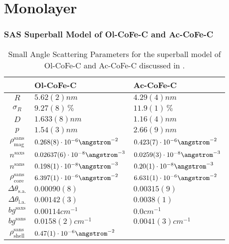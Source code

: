 \documentclass[\main/dresen_thesis.tex]{subfiles}
\begin{document}
\section{Monolayer}
\subsubsection{SAS Superball Model of Ol-CoFe-C and Ac-CoFe-C}\label{ch:appendix:modelparameters:monolayers:sas_olac_cofe_c}
\begin{table}[h]
  \centering
  \caption{\label{tab:appendix:modelparamters:monolayers:nanoparticle:sas}Small Angle Scattering Parameters for the superball model of Ol-CoFe-C and Ac-CoFe-C discussed in .}
  \begin{tabular}{ c | l | l }
      & Ol-CoFe-C & Ac-CoFe-C \\
    \hline
    $R$
      & $5.62(2) \unit{nm}$
      & $4.29(4) \unit{nm}$\\
    $\sigma_R$
      & $9.27(8) \,\%$
      & $11.9(1) \,\%$\\
    $D$
      & $1.633(8) \unit{nm}$
      & $1.16(4) \unit{nm}$\\
    $p$
      & $1.54(3) \unit{nm}$
      & $2.66(9) \unit{nm}$\\
    $\rho_\mathrm{mag}^\mathrm{sans}$
      & $0.268(8) \cdot 10^{-6} \angstrom^{-2}$
      & $0.423(7) \cdot 10^{-6} \angstrom^{-2}$\\
    \hline
    $n^\mathrm{saxs}$
      & $0.02637(6) \cdot 10^{-8} \angstrom^{-3}$
      & $0.0259(3) \cdot 10^{-8} \angstrom^{-3}$\\
    $n^\mathrm{sans}$
      & $0.198(1) \cdot 10^{-8} \angstrom^{-3}$
      & $0.20(1) \cdot 10^{-8} \angstrom^{-3}$\\
    $\rho_\mathrm{core}^\mathrm{sans}$
      & $6.397(1) \cdot 10^{-6} \angstrom^{-2}$
      & $6.631(1) \cdot 10^{-6} \angstrom^{-2}$\\
    $\Delta \theta_\mathrm{s. a.}$
      & $0.00090(8)$
      & $0.00315(9)$\\
    $\Delta \theta_\mathrm{l. a.}$
      & $0.00142(3)$
      & $0.0038(1)$\\
    $bg^\mathrm{saxs}$
      & $0.00114 \unit{cm}^{-1}$
      & $0.0 \unit{cm}^{-1}$\\
    $bg^\mathrm{sans}$
      & $0.0158(2) \unit{cm}^{-1}$
      & $0.0041(3) \unit{cm}^{-1}$\\
    $\rho_\mathrm{shell}^\mathrm{sans}$
      & $0.47(1) \cdot 10^{-6} \angstrom^{-2}$

\end{tabular}
\end{table}
\end{document}
